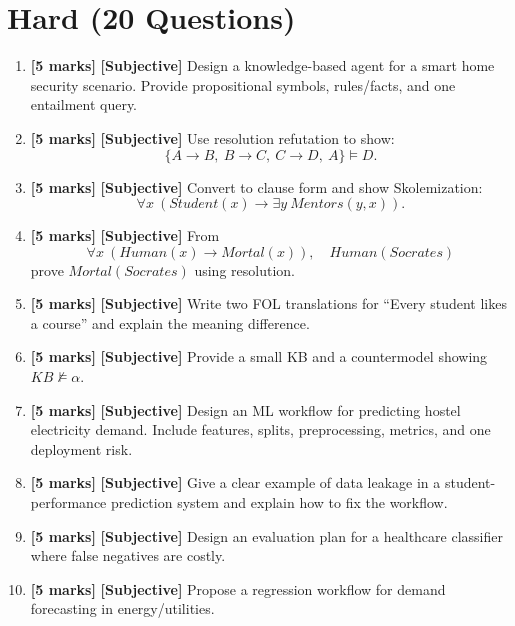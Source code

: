 \documentclass[11pt,a4paper]{article}
\newcommand{\HMarks}{\textbf{[5 marks]} }
\begin{document}
\section*{Hard (20 Questions)}
\begin{enumerate}[label=\textbf{H\arabic*.}, leftmargin=*]
  \item \HMarks \textbf{[Subjective]} Design a knowledge-based agent for a smart home security scenario.
    Provide propositional symbols, rules/facts, and one entailment query.

  \item \HMarks \textbf{[Subjective]} Use resolution refutation to show:
    \[
      \{A \rightarrow B,\ B \rightarrow C,\ C \rightarrow D,\ A\} \models D.
    \]

  \item \HMarks \textbf{[Subjective]} Convert to clause form and show Skolemization:
    \[
      \forall x\ (Student(x) \rightarrow \exists y\ Mentors(y,x)).
    \]

  \item \HMarks \textbf{[Subjective]} From
    \[
      \forall x\ (Human(x) \rightarrow Mortal(x)),\quad Human(Socrates)
    \]
    prove $Mortal(Socrates)$ using resolution.

  \item \HMarks \textbf{[Subjective]} Write two FOL translations for ``Every student likes a course''
    and explain the meaning difference.

  \item \HMarks \textbf{[Subjective]} Provide a small KB and a countermodel showing $KB \not\models \alpha$.

  \item \HMarks \textbf{[Subjective]} Design an ML workflow for predicting hostel electricity demand.
    Include features, splits, preprocessing, metrics, and one deployment risk.

  \item \HMarks \textbf{[Subjective]} Give a clear example of data leakage in a student-performance prediction system
    and explain how to fix the workflow.

  \item \HMarks \textbf{[Subjective]} Design an evaluation plan for a healthcare classifier where false negatives are costly.

  \item \HMarks \textbf{[Subjective]} Propose a regression workflow for demand forecasting in energy/utilities.


\end{enumerate}
\end{document}
